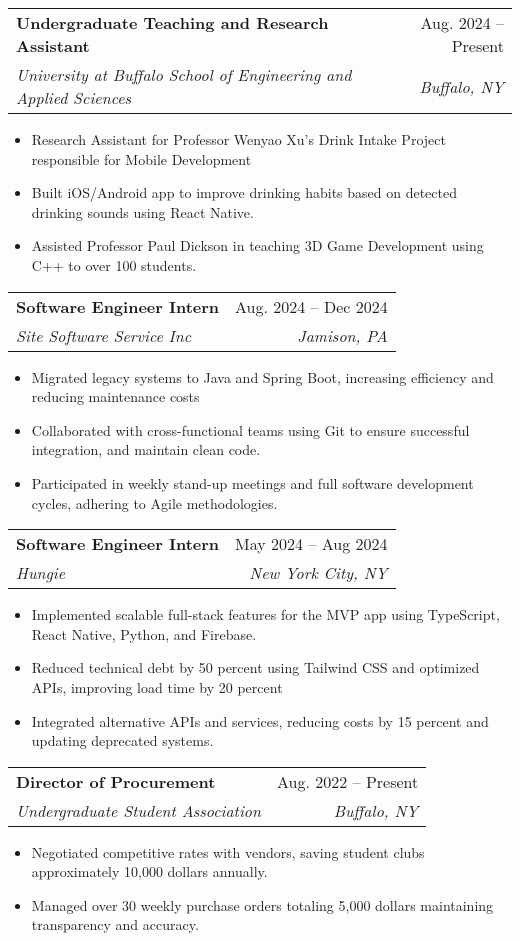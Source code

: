 \documentclass[letterpaper,11pt]{article}
\makeatletter
\newcommand{\resumeItem}[1]{
  \item\small{
    {#1 \vspace{-2pt}}
  }
}
\newcommand{\resumeSubheading}[4]{
  \vspace{-2pt}\item
    \begin{tabular*}{0.97\textwidth}[t]{l@{\extracolsep{\fill}}r}
      \textbf{#1} & #2 \\
      \textit{\small#3} & \textit{\small #4} \\
    \end{tabular*}\vspace{-7pt}
}
\newcommand{\resumeSubSubheading}[2]{
    \item
    \begin{tabular*}{0.97\textwidth}{l@{\extracolsep{\fill}}r}
      \textit{\small#1} & \textit{\small #2} \\
    \end{tabular*}\vspace{-7pt}
}
\newcommand{\resumeSubHeadingListEnd}{\end{itemize}}
\newcommand{\resumeItemListStart}{\begin{itemize}}
\newcommand{\resumeItemListEnd}{\end{itemize}\vspace{-5pt}}
\makeatother
\begin{document}

    \resumeSubheading
      {Undergraduate Teaching and Research Assistant}{Aug. 2024 -- Present}
      {University at Buffalo School of Engineering and Applied Sciences}{Buffalo, NY}
      \resumeItemListStart
        \resumeItem{Research Assistant for Professor Wenyao Xu’s Drink Intake Project responsible for Mobile Development}
        \resumeItem{Built iOS/Android app to improve drinking habits based on detected drinking sounds using React Native.}
        \resumeItem{Assisted Professor Paul Dickson in teaching 3D Game Development using C++ to over 100 students.}
    \resumeItemListEnd

    \resumeSubheading
      {Software Engineer Intern}{Aug. 2024 -- Dec 2024}
      {Site Software Service Inc}{Jamison, PA}
      \resumeItemListStart
        \resumeItem{Migrated legacy systems to Java and Spring Boot, increasing efficiency  and reducing maintenance costs}
        \resumeItem{Collaborated with cross-functional teams using Git to ensure successful integration, and maintain clean code.}
        \resumeItem{Participated in weekly stand-up meetings and full software development cycles, adhering to Agile methodologies.}
    \resumeItemListEnd

    \resumeSubheading
      {Software Engineer Intern}{May 2024 -- Aug 2024}
      {Hungie}{New York City, NY}
      \resumeItemListStart
        \resumeItem{{Implemented scalable full-stack features for the MVP app using TypeScript, React Native, Python, and Firebase.}}
        \resumeItem{Reduced technical debt by 50 percent using Tailwind CSS and optimized APIs, improving load time by 20 percent}
        \resumeItem{Integrated alternative APIs and services, reducing costs by 15 percent and updating deprecated systems.}
    \resumeItemListEnd

    \resumeSubheading
      {Director of Procurement}{Aug. 2022 -- Present}
      {Undergraduate Student Association}{Buffalo, NY}
      \resumeItemListStart
        \resumeItem{Negotiated competitive rates with vendors, saving student clubs approximately 10,000 dollars annually.}
        \resumeItem{Managed over 30 weekly purchase orders totaling 5,000 dollars maintaining transparency and accuracy.}
        \resumeItemListEnd
\end{document}

